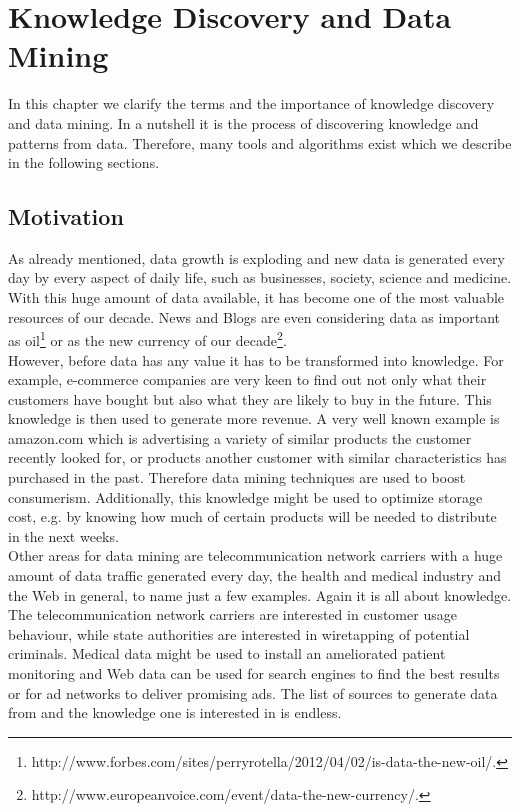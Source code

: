 \chapter{Knowledge Discovery and Data Mining}\label{chapter:kdd}
In this chapter we clarify the terms and the importance of knowledge discovery and data mining. In a nutshell it is the process of discovering knowledge and patterns from data. Therefore, many tools and algorithms exist which we describe in the following sections.
\section{Motivation}
As already mentioned, data growth is exploding and new data is generated every day by every aspect of daily life, such as businesses, society, science and medicine. With this huge amount of data available, it has become one of the most valuable resources of our decade. News and Blogs are even considering data as important as oil\footnote{http://www.forbes.com/sites/perryrotella/2012/04/02/is-data-the-new-oil/.} or as the new currency of our decade\footnote{http://www.europeanvoice.com/event/data-the-new-currency/.}. 
\\
However, before data has any value it has to be transformed into knowledge. For example, e-commerce companies are very keen to find out not only what their customers have bought but also what they are likely to buy in the future. This knowledge is then used to generate more revenue. A very well known example is amazon.com which is advertising a variety of similar products the customer recently looked for, or products another customer with similar characteristics has purchased in the past. Therefore data mining techniques are used to boost consumerism. Additionally, this knowledge might be used to optimize storage cost, e.g. by knowing how much of certain products will be needed to distribute in the next weeks.
\\
Other areas for data mining are telecommunication network carriers with a huge amount of data traffic generated every day, the health and medical industry and the Web in general, to name just a few examples. Again it is all about knowledge. The telecommunication network carriers are interested in customer usage behaviour, while state authorities are interested in wiretapping of potential criminals. Medical data might be used to install an ameliorated patient monitoring and Web data can be used for search engines to find the best results or for ad networks to deliver promising ads. The list of sources to generate data from and the knowledge one is interested in is endless.


